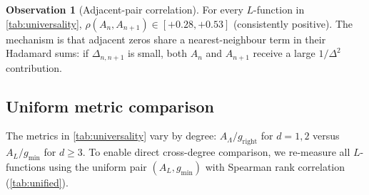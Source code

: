 \documentclass[11pt,a4paper]{article}
\theoremstyle{plain}
\theoremstyle{definition}
\newtheorem{observation}[theorem]{Observation}
\newcommand{\La}{\Lambda}
\begin{document}
\begin{observation}[Adjacent-pair correlation]\label{obs:adjacent}
For every $L$-function in \cref{tab:universality},
$\rho(A_n, A_{n+1}) \in [+0.28, +0.53]$ (consistently positive).
The mechanism is that adjacent zeros share a nearest-neighbour term
in their Hadamard sums: if $\Delta_{n,n+1}$ is small, both $A_n$
and $A_{n+1}$ receive a large $1/\Delta^2$ contribution.
\end{observation}

\subsection{Uniform metric comparison}
\label{ssec:unified}

The metrics in \cref{tab:universality} vary by degree:
$A_\La / g_{\mathrm{right}}$ for $d = 1,2$ versus
$A_L / g_{\min}$ for $d \ge 3$.
To enable direct cross-degree comparison, we re-measure all
$L$-functions using the uniform pair $(A_L, g_{\min})$
with Spearman rank correlation (\cref{tab:unified}).
\end{document}
